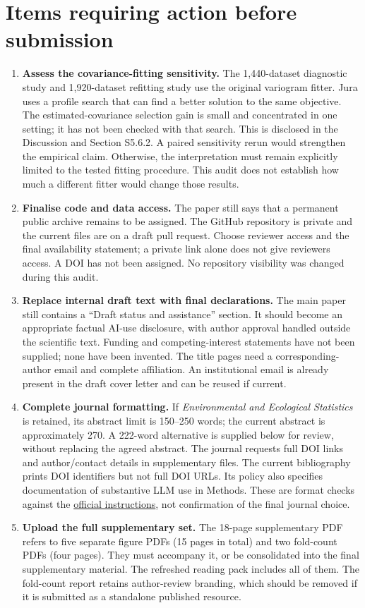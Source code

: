 \documentclass[11pt,a4paper]{article}
\begin{document}
\section*{Items requiring action before submission}
\begin{enumerate}
\item \textbf{Assess the covariance-fitting sensitivity.} The 1,440-dataset diagnostic study and 1,920-dataset refitting study use the original variogram fitter. Jura uses a profile search that can find a better solution to the same objective. The estimated-covariance selection gain is small and concentrated in one setting; it has not been checked with that search. This is disclosed in the Discussion and Section S5.6.2. A paired sensitivity rerun would strengthen the empirical claim. Otherwise, the interpretation must remain explicitly limited to the tested fitting procedure. This audit does not establish how much a different fitter would change those results.
\item \textbf{Finalise code and data access.} The paper still says that a permanent public archive remains to be assigned. The GitHub repository is private and the current files are on a draft pull request. Choose reviewer access and the final availability statement; a private link alone does not give reviewers access. A DOI has not been assigned. No repository visibility was changed during this audit.
\item \textbf{Replace internal draft text with final declarations.} The main paper still contains a ``Draft status and assistance'' section. It should become an appropriate factual AI-use disclosure, with author approval handled outside the scientific text. Funding and competing-interest statements have not been supplied; none have been invented. The title pages need a corresponding-author email and complete affiliation. An institutional email is already present in the draft cover letter and can be reused if current.
\item \textbf{Complete journal formatting.} If \emph{Environmental and Ecological Statistics} is retained, its abstract limit is 150--250 words; the current abstract is approximately 270. A 222-word alternative is supplied below for review, without replacing the agreed abstract. The journal requests full DOI links and author/contact details in supplementary files. The current bibliography prints DOI identifiers but not full DOI URLs. Its policy also specifies documentation of substantive LLM use in Methods. These are format checks against the \href{https://link.springer.com/journal/10651/submission-guidelines}{official instructions}, not confirmation of the final journal choice.
\item \textbf{Upload the full supplementary set.} The 18-page supplementary PDF refers to five separate figure PDFs (15 pages in total) and two fold-count PDFs (four pages). They must accompany it, or be consolidated into the final supplementary material. The refreshed reading pack includes all of them. The fold-count report retains author-review branding, which should be removed if it is submitted as a standalone published resource.
\end{enumerate}
\end{document}
